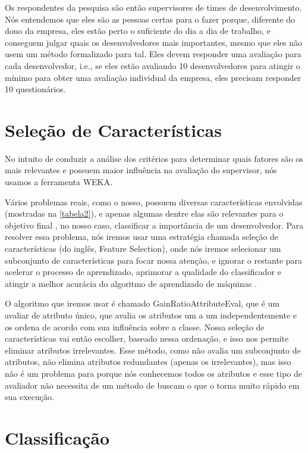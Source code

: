 Os respondentes da pesquisa são então supervisores de times de desenvolvimento. Nós entendemos que eles são as pessoas certas para o fazer porque, diferente do dono da empresa, eles estão perto o suficiente do dia a dia de trabalho, e conseguem julgar quais os desenvolvedores mais importantes, mesmo que eles não usem um método formalizado para tal. Eles devem responder uma avaliação para cada desenvolvedor, i.e., se eles estão avaliando 10 desenvolvedores para atingir o mínimo para obter uma avaliação individual da empresa, eles precisam responder 10 questionários.

\section{Seleção de Características}\label{secao3.3}
No intuito de conduzir a análise dos critérios para determinar quais fatores são os mais relevantes e possuem maior influência na avaliação do supervisor, nós usamos a ferramenta WEKA\cite{Holmes}.

Vários problemas reais, como o nosso, possuem diversas características envolvidas (mostradas na \autoref{tabela2}), e apenas algumas dentre elas são relevantes para o objetivo final \cite{Kira1992}, no nosso caso, classificar a importância de um desenvolvedor. Para resolver essa problema, nós iremos usar uma estratégia chamada seleção de características (do inglês, Feature Selection), onde nós iremos selecionar um subconjunto de características para focar nossa atenção, e ignorar o restante para acelerar o processo de aprendizado, aprimorar a qualidade do classificador e atingir a melhor acurácia do algoritmo de aprendizado de máquinas \cite{Kira1992,Kohavi1997}. 

O algoritmo que iremos usar é chamado GainRatioAttributeEval, que é um avaliar de atributo único, que avalia os atributos um a um independentemente e os ordena de acordo com sua influência sobre a classe. Nossa seleção de características vai então escolher, baseado nessa ordenação, e isso nos permite eliminar atributos irrelevantes. Esse método, como não avalia um subconjunto de atributos, não elimina atributos redundantes (apenas os irrelevantes), mas isso não é um problema para  porque nós conhecemos todos os atributos e esse tipo de avaliador não necessita de um método de buscam o que o torna muito rápido em sua execução.

\section{Classificação}\label{secao3.4}

